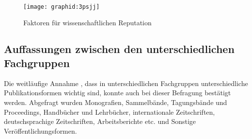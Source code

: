 \begin{figure}[h!]
\texttt{[image: graphid:3psjj]}
\caption{Faktoren für wissenschaftlichen Reputation}
\end{figure}

\subsection{Auffassungen zwischen den unterschiedlichen Fachgruppen}

Die weitläufige Annahme \cite{naeder_2010_open}, dass in unterschiedlichen Fachgruppen unterschiedliche Publikationsformen wichtig sind, konnte auch bei dieser Befragung bestätigt werden. Abgefragt wurden Monografien, Sammelbände, Tagungsbände und Proceedings, Handbücher und Lehrbücher, internationale Zeitschriften, deutschsprachige Zeitschriften, Arbeitsberichte etc. und Sonstige Veröffentlichungsformen.


